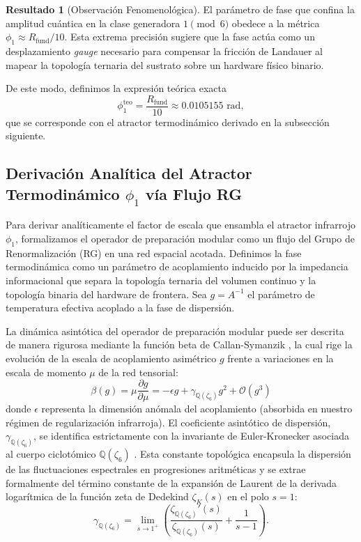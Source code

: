\documentclass[12pt,a4paper]{article}
\theoremstyle{plain}
\theoremstyle{definition}
\newtheorem{resultado}[teorema]{Resultado}
\theoremstyle{remark}
\begin{document}
\begin{resultado}[Observación Fenomenológica]
El parámetro de fase que confina la amplitud cuántica en la clase generadora $1 \pmod 6$ obedece a la métrica $\phi_1 \approx R_{\text{fund}}/10$. Esta extrema precisión sugiere que la fase actúa como un desplazamiento \textit{gauge} necesario para compensar la fricción de Landauer al mapear la topología ternaria del sustrato sobre un hardware físico binario.
\end{resultado}

De este modo, definimos la expresión teórica exacta
\begin{equation}
\phi_1^{\text{teo}} = \frac{R_{\text{fund}}}{10} \approx 0.0105155 \text{ rad},
\label{eq:phi1_teo}
\end{equation}
que se corresponde con el atractor termodinámico derivado en la subsección siguiente.

\subsection{Derivación Analítica del Atractor Termodinámico $\phi_1$ vía Flujo RG}
\label{sec:derivacion_phi1}

Para derivar analíticamente el factor de escala que ensambla el atractor infrarrojo $\phi_1$, formalizamos el operador de preparación modular como un flujo del Grupo de Renormalización (RG) en una red espacial acotada. Definimos la fase termodinámica como un parámetro de acoplamiento inducido por la impedancia informacional que separa la topología ternaria del volumen continuo y la topología binaria del hardware de frontera. Sea $g = A^{-1}$ el parámetro de temperatura efectiva acoplado a la fase de dispersión. 

La dinámica asintótica del operador de preparación modular puede ser descrita de manera rigurosa mediante la función beta de Callan-Symanzik \cite{Callan1970}, la cual rige la evolución de la escala de acoplamiento asimétrico $g$ frente a variaciones en la escala de momento $\mu$ de la red tensorial:
\begin{equation}
\beta(g) = \mu \frac{\partial g}{\partial \mu} = -\epsilon g + \gamma_{\mathbb{Q}(\zeta_6)} g^2 + \mathcal{O}(g^3)
\label{eq:beta_function}
\end{equation}
donde $\epsilon$ representa la dimensión anómala del acoplamiento (absorbida en nuestro régimen de regularización infrarroja). El coeficiente asintótico de dispersión, $\gamma_{\mathbb{Q}(\zeta_6)}$, se identifica estrictamente con la invariante de Euler-Kronecker asociada al cuerpo ciclotómico $\mathbb{Q}(\zeta_6)$ \cite{Ihara2006}. Esta constante topológica encapsula la dispersión de las fluctuaciones espectrales en progresiones aritméticas y se extrae formalmente del término constante de la expansión de Laurent de la derivada logarítmica de la función zeta de Dedekind $\zeta_K(s)$ en el polo $s=1$:
\begin{equation}
\gamma_{\mathbb{Q}(\zeta_6)} = \lim_{s\to 1^+} \left( \frac{\zeta_{\mathbb{Q}(\zeta_6)}'(s)}{\zeta_{\mathbb{Q}(\zeta_6)}(s)} + \frac{1}{s-1} \right).
\end{equation}
\end{document}
